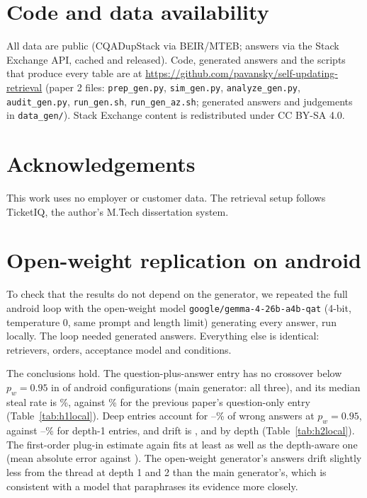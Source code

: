 \documentclass[11pt]{article}
\begin{document}
\section*{Code and data availability}
All data are public (CQADupStack via BEIR/MTEB; answers via the Stack Exchange API, cached and released). Code, generated answers and the scripts that produce every table are at \url{https://github.com/pavansky/self-updating-retrieval} (paper 2 files: \texttt{prep\_gen.py}, \texttt{sim\_gen.py}, \texttt{analyze\_gen.py}, \texttt{audit\_gen.py}, \texttt{run\_gen.sh}, \texttt{run\_gen\_az.sh}; generated answers and judgements in \texttt{data\_gen/}). Stack Exchange content is redistributed under CC BY-SA 4.0.

\section*{Acknowledgements}
This work uses no employer or customer data. The retrieval setup follows TicketIQ, the author's M.Tech dissertation system.



\appendix
\section{Open-weight replication on android}\label{app:local}
To check that the results do not depend on the generator, we repeated the full android loop with the open-weight model \texttt{google/gemma-4-26b-a4b-qat} (4-bit, temperature 0, same prompt and length limit) generating every answer, run locally. The loop needed \nGenTotalLocal{} generated answers. Everything else is identical: retrievers, orders, acceptance model and conditions.

The conclusions hold. The question-plus-answer entry has no crossover below $p_w=0.95$ in \nSafeAskGenLocal{} of \nConfigsLocal{} android configurations (main generator: all three), and its median steal rate is \stealMedAskGenLocal{}\%, against \stealMedPOneAskLocal{}\% for the previous paper's question-only entry (Table~\ref{tab:h1local}). Deep entries account for \wrongDTwoLoLocal{}--\wrongDTwoHiLocal{}\% of wrong answers at $p_w=0.95$, against \wrongDOneLoLocal{}--\wrongDOneHiLocal{}\% for depth-1 entries, and drift is \driftZeroLocal{}, \driftOneLocal{} and \driftTwoLocal{} by depth (Table~\ref{tab:h2local}). The first-order plug-in estimate again fits at least as well as the depth-aware one (mean absolute error \maePlugOneLocal{} against \maePlugTwoLocal{}). The open-weight generator's answers drift slightly less from the thread at depth 1 and 2 than the main generator's, which is consistent with a model that paraphrases its evidence more closely.
\end{document}
